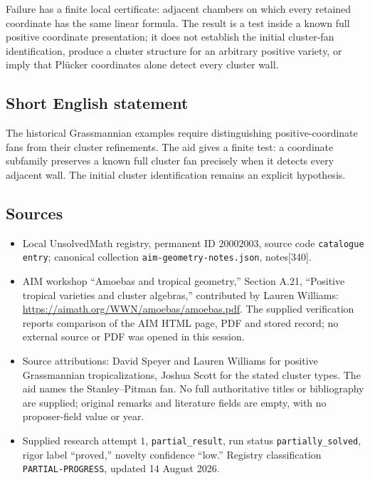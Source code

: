 \documentclass[11pt]{article}
\begin{document}
Failure has a finite local certificate: adjacent chambers on which every retained coordinate has the same linear formula. The result is a test inside a known full positive coordinate presentation; it does not establish the initial cluster-fan identification, produce a cluster structure for an arbitrary positive variety, or imply that Pl\"ucker coordinates alone detect every cluster wall.
\subsection{Short English statement}
The historical Grassmannian examples require distinguishing positive-coordinate fans from their cluster refinements. The aid gives a finite test: a coordinate subfamily preserves a known full cluster fan precisely when it detects every adjacent wall. The initial cluster identification remains an explicit hypothesis.
\subsection{Sources}
\begin{itemize}
\item Local UnsolvedMath registry, permanent ID \(20002003\), source code \texttt{catalogue entry}; canonical collection \texttt{aim-geometry-notes.json}, notes[340].
\item AIM workshop ``Amoebas and tropical geometry,'' Section A.21, ``Positive tropical varieties and cluster algebras,'' contributed by Lauren Williams: \url{https://aimath.org/WWN/amoebas/amoebas.pdf}. The supplied verification reports comparison of the AIM HTML page, PDF and stored record; no external source or PDF was opened in this session.
\item Source attributions: David Speyer and Lauren Williams for positive Grassmannian tropicalizations, Joshua Scott for the stated cluster types. The aid names the Stanley--Pitman fan. No full authoritative titles or bibliography are supplied; original remarks and literature fields are empty, with no proposer-field value or year.
\item Supplied research attempt \(1\), \texttt{partial\_result}, run status \texttt{partially\_solved}, rigor label ``proved,'' novelty confidence ``low.'' Registry classification \texttt{PARTIAL-PROGRESS}, updated 14 August 2026.
\end{itemize}
\end{document}
